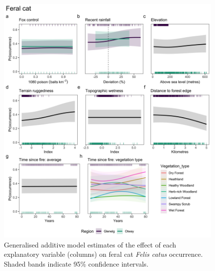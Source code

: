 \documentclass[11pt,a4paper,titlepage,twoside,openright]{style/unimelbthesis}
\begin{document}
\begin{mainmatter}
\begin{figure}
{\centering \includegraphics[width=1\linewidth]{figure/gams_cat} 

}

\caption{Generalised additive model estimates of the effect of each explanatory variable (columns) on feral cat \textit{Felis catus} occurrence. Shaded bands indicate 95\% confidence intervals.}\label{fig:gams-occ-cat}
\end{figure}
\newpage
\begin{figure}


\end{figure}
\end{mainmatter}
\end{document}
